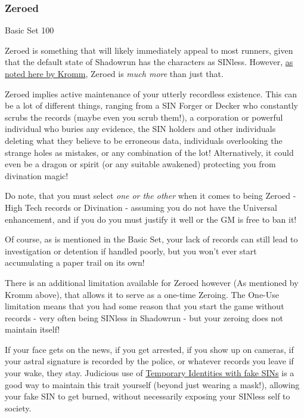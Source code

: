 \begin{multicols}{3}
	\subsubsection*{Zeroed}\label{zeroed}
	\begin{flushright}
		Basic Set 100
	\end{flushright}
	
	Zeroed is something that will likely immediately appeal to most runners, given that the default state of Shadowrun has the characters as SINless. However, \textcolor{Blue}{\href{http://forums.sjgames.com/showpost.php?p=932347&postcount=35}{as noted here by Kromm}}, Zeroed is \textit{much more} than just that.
	
	Zeroed implies active maintenance of your utterly recordless existence. This can be a lot of different things, ranging from a SIN Forger or Decker who constantly scrubs the records (maybe even you scrub them!), a corporation or powerful individual who buries any evidence, the SIN holders and other individuals deleting what they believe to be erroneous data, individuals overlooking the strange holes as mistakes, or any combination of the lot! Alternatively, it could even be a dragon or spirit (or any suitable awakened) protecting you from divination magic!
	
	Do note, that you must select \textit{one or the other} when it comes to being Zeroed - High Tech records or Divination - assuming you do not have the Universal enhancement, and if you do you must justify it well or the GM is free to ban it! 
	
	Of course, as is mentioned in the Basic Set, your lack of records can still lead to investigation or detention if handled poorly, but you won't ever start accumulating a paper trail on its own!
	
	There is an additional limitation available for Zeroed however (As mentioned by Kromm above), that allows it to serve as a one-time Zeroing. The One-Use limitation means that you had some reason that you start the game without records - very often being SINless in Shadowrun - but your zeroing does not maintain itself! 
	
	If your face gets on the news, if you get arrested, if you show up on cameras, if your astral signature is recorded by the police, or whatever records you leave if your wake, they stay. Judicious use of \hyperref[fake_SINs]{Temporary Identities with fake SINs} is a good way to maintain this trait yourself (beyond just wearing a mask!), allowing your fake SIN to get burned, without necessarily exposing your SINless self to society.
	

\end{multicols}
